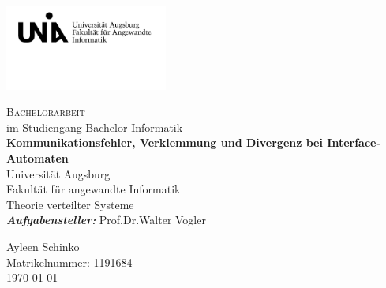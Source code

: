\begin{titlepage}
\includegraphics[width=0.4\textwidth]{Uni_Aug_Logo_FAI_schwarz.png}
\vspace{-1cm}
\begin{center}
  \LARGE \textsc{Bachelorarbeit}\\
  \normalsize im Studiengang Bachelor Informatik\\
  \vfill
  \Huge \textbf{Kommunikationsfehler, Verklemmung und Divergenz bei
  Interface-Automaten}\\
  \vfill
  \LARGE \sffamily Universität Augsburg\\
  Fakultät für angewandte Informatik\\
  Theorie verteilter Systeme\\
  \vspace{2cm}
  \rmfamily \large \textit{\textbf{Aufgabensteller:}} Prof.\;Dr.\;Walter Vogler
\end{center}
\vspace{1.5cm}
\large %
Ayleen Schinko\\
Matrikelnummer: 1191684\\
\today
\end{titlepage}
